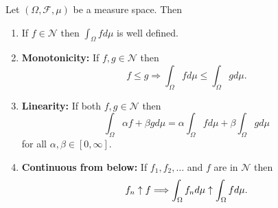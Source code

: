 

\begin{theorem} Let $(\Omega, \mathcal F, \mu)$ be a measure space. Then
\begin{enumerate}
\item If $f\in \mathscr N$ then $\int_\Omega f d\mu$ is well defined.
\item {\bf Monotonicity:} If $f, g\in \mathscr N$ then
\[ \text{$f\leq g$}\Longrightarrow \int_\Omega fd\mu\leq \int_\Omega g d\mu.  \]
\item {\bf Linearity:}
If both $f, g\in \mathscr N$ then
\begin{equation}
\label{llin}
\int_\Omega \alpha f + \beta g d\mu =  \alpha \int_\Omega fd\mu + \beta \int_\Omega gd\mu
\end{equation}
for all $ \alpha, \beta\in[0,\infty]$.
\item {\bf Continuous from below:} If $f_1, f_2,\ldots$ and $f$ are in $\mathscr N$ then
\[ \text{$ f_n\uparrow f$}\Longrightarrow \int_\Omega f_n d\mu\uparrow \int_\Omega f d\mu.  \]
\end{enumerate}
\end{theorem}

%

